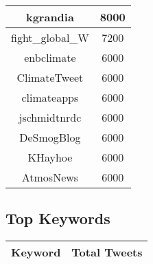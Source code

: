 \documentclass{article}\usepackage[T1]{fontenc}
\begin{document}
\begin{tabular}{|c|c|}
 \hline
kgrandia & 8000\\ 
 \hline
fight\_global\_W & 7200\\ 
 \hline
enbclimate & 6000\\ 
 \hline
ClimateTweet & 6000\\ 
 \hline
climateapps & 6000\\ 
 \hline
jschmidtnrdc & 6000\\ 
 \hline
DeSmogBlog & 6000\\ 
 \hline
KHayhoe & 6000\\ 
 \hline
AtmosNews & 6000\\ 
 \hline
\end{tabular}\subsection*{Top Keywords}\begin{tabular}{|c|c|}         \hline         Keyword & Total Tweets \\ 
 \hline
\end{tabular}
\end{document}
